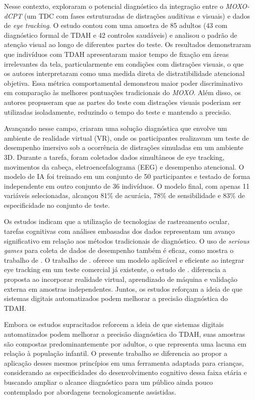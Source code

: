 \documentclass[11pt,a4paper]{article}
\begin{document}
Nesse contexto, \cite{Elbaum2020} exploraram o potencial diagnóstico da integração
entre o \textit{MOXO-dCPT} (um TDC com fases estruturadas de distrações
auditivas e visuais) e dados de \textit{eye tracking}. O estudo contou com uma
amostra de 85 adultos (43 com diagnóstico formal de TDAH e 42 controles saudáveis) e
analisou o padrão de atenção visual ao longo de diferentes partes do teste. Os resultados
demonstraram que indivíduos com TDAH apresentaram maior tempo de fixação em áreas
irrelevantes da tela, particularmente em condições com distrações visuais, o que os autores
interpretaram como uma medida direta de distratibilidade atencional objetiva. Essa métrica
comportamental demonstrou maior poder discriminativo em comparação às melhores
pontuações tradicionais do \textit{MOXO}. Além disso, os autores propuseram que as partes do teste
com distrações visuais poderiam ser utilizadas isoladamente, reduzindo o tempo do teste e
mantendo a precisão.

Avançando nesse campo, \cite{Wiebe2024} criaram uma solução diagnóstica que
envolve um ambiente de realidade virtual (VR), onde os participantes realizavam um teste de
desempenho imersivo sob a ocorrência de distrações simuladas em um ambiente 3D.
Durante a tarefa, foram coletados dados simultâneos de eye tracking, movimentos da
cabeça, eletroencefalograma (EEG) e desempenho atencional. O modelo de IA foi treinado
em um conjunto de 50 participantes e testado de forma independente em outro conjunto de
36 indivíduos. O modelo final, com apenas 11 variáveis selecionadas, alcançou 81\% de
acurácia, 78\% de sensibilidade e 83\% de especificidade no conjunto de teste.

Os estudos indicam que a utilização de tecnologias de rastreamento ocular, tarefas
cognitivas com análises embasadas dos dados representam um avanço significativo em
relação aos métodos tradicionais de diagnóstico. O uso de \textit{serious games} para coleta de
dados de desempenho também é eficaz, como mostra o trabalho de \cite{Nascimento2020}.
O trabalho de \cite{Elbaum2020}. oferece um modelo aplicável e eficiente ao integrar eye tracking
em um teste comercial já existente, o estudo de \cite{Wiebe2024}. diferencia a proposta ao
incorporar realidade virtual, aprendizado de máquina e validação externa em amostras
independentes. Juntos, os estudos reforçam a ideia de que sistemas digitais automatizados
podem melhorar a precisão diagnóstica do TDAH.

Embora os estudos supracitados reforcem a ideia de que sistemas digitais
automatizados podem melhorar a precisão diagnóstica do TDAH, suas amostras
são compostas predominantemente por adultos, o que representa uma lacuna em
relação à população infantil. O presente trabalho se diferencia ao propor a
aplicação desses mesmos princípios em
uma ferramenta adaptada para crianças, considerando as especificidades do
desenvolvimento cognitivo dessa faixa etária e buscando ampliar o alcance
diagnóstico para um público ainda pouco contemplado por abordagens
tecnologicamente assistidas.
\end{document}
